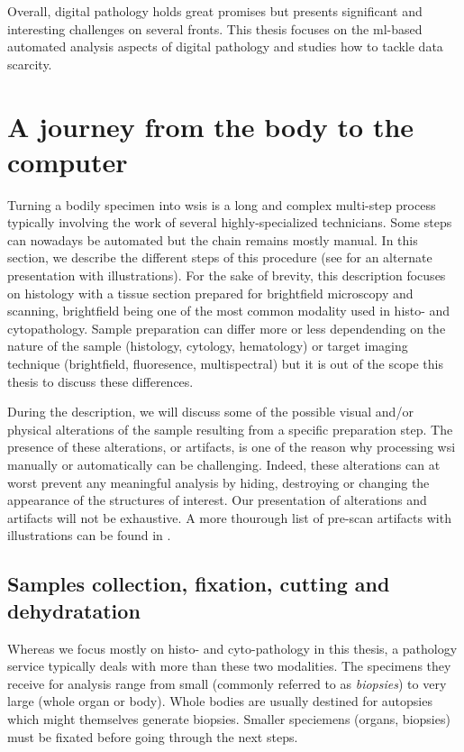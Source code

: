 Overall, digital pathology holds great promises but presents significant and interesting challenges on several fronts. This thesis focuses on the \acrshort{ml}-based automated analysis aspects of digital pathology and studies how to tackle data scarcity.

\section{A journey from the body to the computer}
\label{sec:backdp:wsi}

Turning a bodily specimen into \acrlong{wsi}s is a long and complex multi-step process typically involving the work of several highly-specialized technicians. Some steps can nowadays be automated but the chain remains mostly manual. In this section, we describe the different steps of this procedure (see \parencite{mccann2014automated} for an alternate presentation with illustrations). For the sake of brevity, this description focuses on histology with a tissue section prepared for brightfield microscopy and scanning, brightfield being one of the most common modality used in histo- and cytopathology. Sample preparation can differ more or less dependending on the nature of the sample (\eg histology, cytology, hematology) or target imaging technique (\eg brightfield, fluoresence, multispectral) but it is out of the scope this thesis to discuss these differences. 

During the description, we will discuss some of the possible visual and/or physical alterations of the sample resulting from a specific preparation step. The presence of these alterations, or artifacts, is one of the reason why processing \acrshort{wsi} manually or automatically can be challenging. Indeed, these alterations can at worst prevent any meaningful analysis by hiding, destroying or changing the appearance of the structures of interest. Our presentation of alterations and artifacts will not be exhaustive. A more thourough list of pre-scan artifacts with illustrations can be found in \parencite{taqi2018review}. 

\subsection{Samples collection, fixation, cutting and dehydratation}

Whereas we focus mostly on histo- and cyto-pathology in this thesis, a pathology service typically deals with more than these two modalities. The specimens they receive for analysis range from small (commonly referred to as \textit{biopsies}) to very large (whole organ or body). Whole bodies are usually destined for autopsies which might themselves generate biopsies. Smaller speciemens (organs, biopsies) must be fixated before going through the next steps. 

